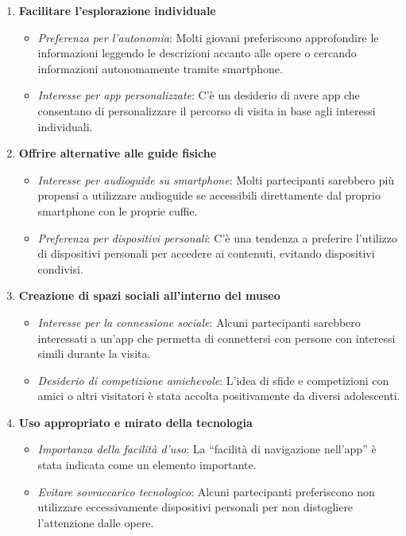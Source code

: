 \documentclass{article}
\begin{document}
\begin{enumerate}
    \item \textbf{Facilitare l'esplorazione individuale}
        \begin{itemize}
            \item \textit{Preferenza per l'autonomia}: Molti giovani preferiscono approfondire le informazioni leggendo le descrizioni accanto alle opere o cercando informazioni autonomamente tramite smartphone.
            \item \textit{Interesse per app personalizzate}: C'è un desiderio di avere app che consentano di personalizzare il percorso di visita in base agli interessi individuali.
        \end{itemize}

    \item \textbf{Offrire alternative alle guide fisiche}
        \begin{itemize}
            \item \textit{Interesse per audioguide su smartphone}: Molti partecipanti sarebbero più propensi a utilizzare audioguide se accessibili direttamente dal proprio smartphone con le proprie cuffie.
            \item \textit{Preferenza per dispositivi personali}: C'è una tendenza a preferire l'utilizzo di dispositivi personali per accedere ai contenuti, evitando dispositivi condivisi.
        \end{itemize}
    
    \item \textbf{Creazione di spazi sociali all'interno del museo}
        \begin{itemize}
            \item \textit{Interesse per la connessione sociale}: Alcuni partecipanti sarebbero interessati a un'app che permetta di connettersi con persone con interessi simili durante la visita.
            \item \textit{Desiderio di competizione amichevole}: L'idea di sfide e competizioni con amici o altri visitatori è stata accolta positivamente da diversi adolescenti.
        \end{itemize}

    \item \textbf{Uso appropriato e mirato della tecnologia}
        \begin{itemize}
            \item \textit{Importanza della facilità d'uso}: La ``facilità di navigazione nell'app'' è stata indicata come un elemento importante.
            \item \textit{Evitare sovraccarico tecnologico}: Alcuni partecipanti preferiscono non utilizzare eccessivamente dispositivi personali per non distogliere l'attenzione dalle opere.
        \end{itemize}
        

\end{enumerate}
\end{document}
